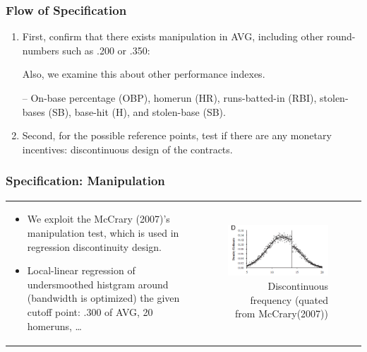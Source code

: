\documentclass[dvipdfmx,12pt]{beamer}
\begin{document}
\begin{frame}\frametitle{Flow of Specification}
  \begin{enumerate}
    \item First, confirm that there exists manipulation in AVG, including other round-numbers such as .200 or .350:

    Also, we examine this about other performance indexes.

    -- On-base percentage (OBP), homerun (HR), runs-batted-in (RBI), stolen-bases (SB), base-hit (H), and stolen-base (SB).

    \item Second, for the possible reference points, test if there are any monetary incentives: discontinuous design of the contracts.
  \end{enumerate}
\end{frame}

\begin{frame}\frametitle{Specification: Manipulation}

  \begin{tabular}{lr}
    \begin{minipage}[H]{0.4\textwidth}
      \small
      \begin{itemize}
        \item We exploit the McCrary (2007)'s manipulation test, which is used in regression discontinuity design.

        \item Local-linear regression of undersmoothed histgram around (bandwidth is optimized) the given cutoff point: .300 of AVG, 20 homeruns, \ldots
      \end{itemize}
    \end{minipage}
    &
    \begin{minipage}[H]{0.55\textwidth}
      \begin{figure}
        \includegraphics[keepaspectratio, scale = 1]{graphs/McCrary_figD.png}
        \caption{Discontinuous frequency (quated from McCrary(2007))}
        \label{McC}
      \end{figure}
    \end{minipage}
  \end{tabular}

\end{frame}
\end{document}

